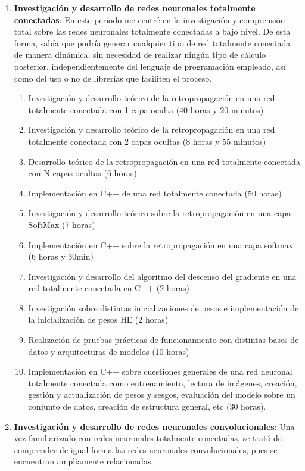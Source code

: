 \begin{enumerate}[label=\textbullet]
	\item \textbf{Investigación y desarrollo de redes neuronales totalmente conectadas}: En este periodo me centré en la investigación y comprensión total sobre las redes neuronales totalmente conectadas a bajo nivel. De esta forma, sabía que podría generar cualquier tipo de red totalmente conectada de manera dinámica, sin necesidad de realizar ningún tipo de cálculo posterior, independientemente del lenguaje de programación empleado, así como del uso o no de librerías que faciliten el proceso. 
	\begin{enumerate}[label=\textbullet]
		\item Investigación y desarrollo teórico de la retropropagación en una red totalmente conectada con 1 capa oculta (40 horas y 20 minutos)
		\item Investigación y desarrollo teórico de la retropropagación en una red totalmente conectada con 2 capas ocultas (8 horas y 55 minutos)
		\item Desarrollo teórico de la retropropagación en una red totalmente conectada con N capas ocultas (6 horas)
		\item Implementación en C++ de una red totalmente conectada (50 horas)
		\item Investigación y desarrollo teórico sobre la retropropagación en una capa SoftMax (7 horas)
		\item Implementación en C++ sobre la retropropagación en una capa softmax (6 horas y 30min)
		\item Investigación y desarrollo del algoritmo del descenso del gradiente en una red totalmente conectada en C++ (2 horas)
		\item Investigación sobre distintas inicializaciones de pesos e implementación de la inicialización de pesos HE (2 horas)	
		\item Realización de pruebas prácticas de funcionamiento con distintas bases de datos y arquitecturas de modelos (10 horas)	
		\item Implementación en C++ sobre cuestiones generales de una red neuronal totalmente conectada como entrenamiento, lectura de imágenes, creación, gestión y actualización de pesos y sesgos, evaluación del modelo sobre un conjunto de datos, creación de estructura general, etc (30 horas).
	\end{enumerate}
	\item \textbf{Investigación y desarrollo de redes neuronales convolucionales}:
	Una vez familiarizado con redes neuronales totalmente conectadas, se trató de comprender de igual forma las redes neuronales convolucionales, pues se encuentran ampliamente relacionadas.

\end{enumerate}

